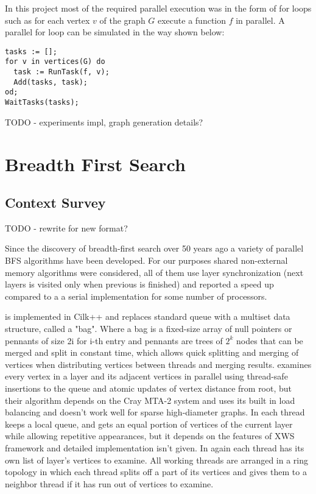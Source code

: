\documentclass{report}
\theoremstyle{plain}
\theoremstyle{definition}
\theoremstyle{remark}
\begin{document}
In this project most of the required parallel execution was in the form of for loops such as for each vertex $v$ of the graph $G$ execute a function $f$ in parallel. A parallel for loop can be simulated in the way shown below:

\begin{lstlisting}
tasks := [];
for v in vertices(G) do
  task := RunTask(f, v);
  Add(tasks, task);
od;
WaitTasks(tasks);
\end{lstlisting}

TODO - experiments impl, graph generation details?

\chapter{Breadth First Search}

\section{Context Survey}

TODO - rewrite for new format?

Since the discovery of breadth-first search over 50 years ago a variety of parallel BFS algorithms have been developed. For our purposes shared non-external memory algorithms \cite{Leiserson, bader2006designing, cong2008solving, zhang2006parallel} were considered, all of them use layer synchronization (next layers is visited only when previous is finished) and reported a speed up compared to a a serial implementation for some number of processors.

\cite{Leiserson} is implemented in Cilk++ and replaces standard queue with a multiset data structure, called a "bag". Where a bag is a fixed-size array of null pointers or pennants of size 2i for i-th entry and pennants are trees of $2^k$ nodes that can be merged and split in constant time, which allows quick splitting and merging of vertices when distributing vertices between threads and merging results.
\cite{bader2006designing} examines every vertex in a layer and its adjacent vertices in parallel using thread-safe insertions to the queue and atomic updates of vertex distance from root, but their algorithm depends on the Cray MTA-2 system and uses its built in load balancing and doesn't work well for sparse high-diameter graphs.
In \cite{cong2008solving} each thread keeps a local queue, and gets an equal portion of vertices of the current layer while allowing repetitive appearances, but it depends on the features of XWS framework and detailed implementation isn't given.
In \cite{zhang2006parallel} again each thread has its own list of layer's vertices to examine. All working threads are arranged in a ring topology in which each thread splits off a part of its vertices and gives them to a neighbor thread if it has run out of vertices to examine.
\end{document}
